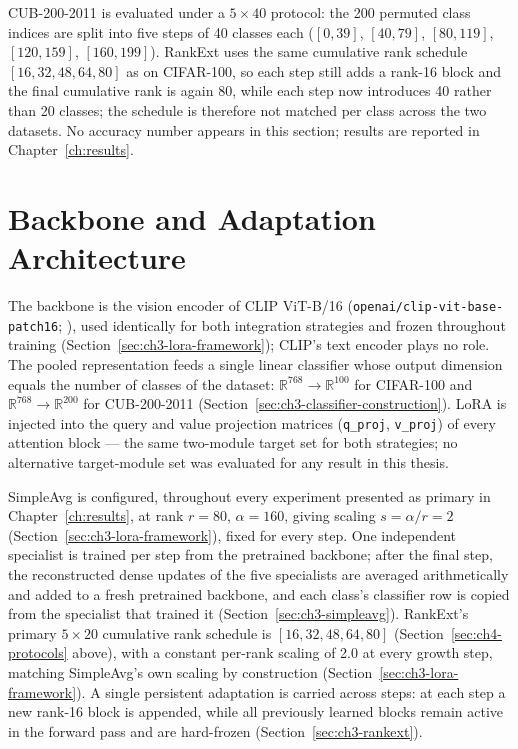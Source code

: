 CUB-200-2011 is evaluated under a $5\times40$ protocol: the 200 permuted
class indices are split into five steps of 40 classes each ($[0,39]$,
$[40,79]$, $[80,119]$, $[120,159]$, $[160,199]$). RankExt uses the same
cumulative rank schedule $[16,32,48,64,80]$ as on CIFAR-100, so each step
still adds a rank-16 block and the final cumulative rank is again 80, while
each step now introduces 40 rather than 20 classes; the schedule is
therefore not matched per class across the two datasets. No accuracy
number appears in this section; results are reported in
Chapter~\ref{ch:results}.

\section{Backbone and Adaptation Architecture}
\label{sec:ch4-backbone}

The backbone is the vision encoder of CLIP ViT-B/16
(\texttt{openai/clip-vit-base-patch16}; \parencite{radford2021learning}),
used identically for both integration strategies and frozen throughout
training (Section~\ref{sec:ch3-lora-framework}); CLIP's text encoder plays
no role. The pooled representation feeds a single linear classifier
whose output dimension equals the number of classes of the dataset:
$\mathbb{R}^{768}\to\mathbb{R}^{100}$ for CIFAR-100 and
$\mathbb{R}^{768}\to\mathbb{R}^{200}$ for CUB-200-2011
(Section~\ref{sec:ch3-classifier-construction}).
LoRA is injected into the query and value projection matrices
(\texttt{q\_proj}, \texttt{v\_proj}) of every attention block --- the same
two-module target set for both strategies; no alternative target-module set
was evaluated for any result in this thesis.

SimpleAvg is configured, throughout every experiment presented as primary in
Chapter~\ref{ch:results}, at rank $r=80$, $\alpha=160$, giving scaling
$s=\alpha/r=2$ (Section~\ref{sec:ch3-lora-framework}), fixed for every step.
One independent specialist is trained per step from the pretrained backbone;
after the final step, the reconstructed dense updates of the five
specialists are averaged arithmetically and added to a fresh pretrained
backbone, and each class's classifier row is copied from the specialist
that trained it (Section~\ref{sec:ch3-simpleavg}).
RankExt's primary $5\times20$ cumulative rank schedule is
$[16,32,48,64,80]$ (Section~\ref{sec:ch4-protocols} above), with a constant
per-rank scaling of 2.0 at every growth step, matching SimpleAvg's own
scaling by construction (Section~\ref{sec:ch3-lora-framework}). A single
persistent adaptation is carried across steps: at each step a new rank-16
block is appended, while all previously learned blocks remain active in the
forward pass and are hard-frozen (Section~\ref{sec:ch3-rankext}).

